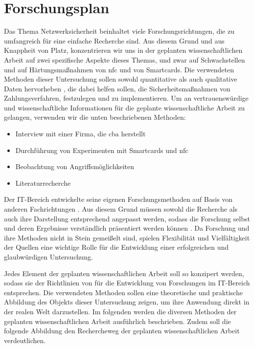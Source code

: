 \section{Forschungsplan}

Das Thema Netzwerksicherheit beinhaltet viele Forschungsrichtungen, die zu umfangreich für eine einfache
Recherche sind. Aus diesem Grund und aus Knappheit von Platz, konzentrieren wir uns in der geplanten 
wissenschaftlichen Arbeit auf zwei spezifische Aspekte dieses Themas, und zwar auf Schwachstellen und 
auf Härtungsmaßnahmen von \acrshort{nfc} und von Smartcards. Die verwendeten Methoden dieser Untersuchung 
sollen sowohl quantitative als auch qualitative Daten hervorheben \cite{refbook:RMJL}, die dabei helfen sollen, 
die Sicherheitsmaßnahmen von Zahlungsverfahren, festzulegen und zu implementieren. Um an vertrauenswürdige 
und wissenschaftliche Informationen für die geplante wissenschaftliche Arbeit zu gelangen, verwenden wir 
die unten beschriebenen Methoden:

\begin{itemize}
  \item Interview mit einer Firma, die \acrfull{cba} herstellt
  \item Durchführung von Experimenten mit Smartcards und \acrshort{nfc}
  \item Beobachtung von Angriffsmöglichkeiten
  \item Literaturrecherche
\end{itemize}

Der IT-Bereich entwickelte seine eigenen Forschungsmethoden auf Basis von anderen Fachrichtungen \cite{inbook:AHDS}.
Aus diesem Grund müssen sowohl die Recherche als auch ihre Darstellung entsprechend angepasst werden, sodass 
die Forschung selbst und deren Ergebnisse verständlich präsentiert werden können \cite{refbook:RMJL}. Da Forschung und 
ihre Methoden nicht in Stein gemeißelt sind, spielen Flexibilität und Vielfältigkeit der Quellen eine wichtige 
Rolle für die Entwicklung einer erfolgreichen und glaubwürdigen Untersuchung.

Jedes Element der geplanten wissenschaftlichen Arbeit soll so konzipert werden, sodass sie der Richtlinien von
\cite{refip:SGRM} für die Entwicklung von Forschungen im IT-Bereich entsprechen. Die verwendeten Methoden 
sollen eine theoretische und praktische Abbildung des Objekts dieser Untersuchung zeigen, um ihre Anwendung 
direkt in der realen Welt darzustellen. Im folgenden werden die diversen Methoden der geplanten wissenschaftlichen 
Arbeit ausführlich beschrieben. Zudem soll die folgende Abbildung den Rechercheweg der geplanten wissenschaftlichen 
Arbeit verdeutlichen.


